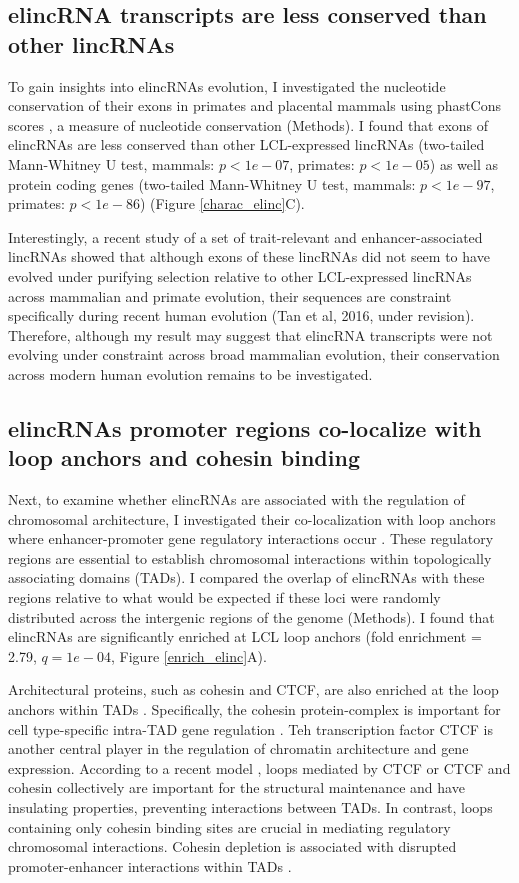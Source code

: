 \documentclass[11pt,a4paper]{report}
\begin{document}
\subsection*{elincRNA transcripts are less conserved than other lincRNAs}

To gain insights into elincRNAs evolution, I investigated the nucleotide conservation of their exons in primates and placental mammals using phastCons scores \cite{Siepel2005}⁠, a measure of nucleotide conservation (Methods). I found that exons of elincRNAs are less conserved than other LCL-expressed lincRNAs (two-tailed Mann-Whitney U test, mammals: $p<1e-07$, primates: $p<1e-05$) as well as  protein coding genes (two-tailed Mann-Whitney U test, mammals: $p<1e-97$, primates: $p<1e-86$) (Figure \ref{charac_elinc}C). 

Interestingly, a recent study of a set of trait-relevant and enhancer-associated lincRNAs showed that although exons of these lincRNAs did not seem to have evolved under purifying selection relative to other LCL-expressed lincRNAs across mammalian and primate evolution, their sequences are constraint specifically during recent human evolution (Tan et al, 2016, under revision). Therefore, although my result may suggest that elincRNA transcripts were not evolving under constraint across broad mammalian evolution, their conservation across modern human evolution remains to be investigated.

\subsection*{elincRNAs promoter regions co-localize with loop anchors and cohesin binding}

Next, to examine whether elincRNAs are associated with the regulation of chromosomal architecture, I investigated their co-localization with loop anchors where enhancer-promoter gene regulatory interactions occur \cite{Ji2016}. These regulatory regions are essential to establish chromosomal interactions within topologically associating domains (TADs). I compared the overlap of elincRNAs with these regions relative to what would be expected if these loci were randomly distributed across the intergenic regions of the genome (Methods). I found that elincRNAs are significantly enriched at LCL loop anchors (fold enrichment = 2.79, $q=1e-04$, Figure \ref{enrich_elinc}A).  

Architectural proteins, such as cohesin and CTCF, are also enriched at the loop anchors within TADs \cite{Rao2014}⁠. Specifically, the cohesin protein-complex is important for cell type-specific intra-TAD gene regulation \cite{Hadjur2009}⁠. Teh transcription factor CTCF is another central player in the regulation of chromatin architecture and gene expression. According to a recent model \cite{Ji2016}⁠, loops mediated by CTCF or CTCF and cohesin collectively are important for the structural maintenance and have insulating properties, preventing interactions between TADs. In contrast, loops containing only cohesin binding sites are crucial in mediating regulatory chromosomal interactions. Cohesin depletion is associated with disrupted promoter-enhancer interactions within TADs \cite{Seitan2013}⁠.
\end{document}
